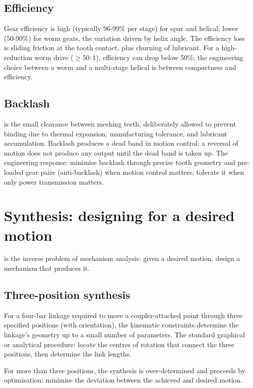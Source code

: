 \subsection{Efficiency}

Gear efficiency is high (typically 96-99\% per stage) for spur and helical; lower (50-90\%) for worm gears, the variation driven by helix angle. The efficiency loss is sliding friction at the tooth contact, plus churning of lubricant. For a high-reduction worm drive ($\geq 50:1$), efficiency can drop below 50\%; the engineering choice between a worm and a multi-stage helical is between compactness and efficiency.

\subsection{Backlash}

 is the small clearance between meshing teeth, deliberately allowed to prevent binding due to thermal expansion, manufacturing tolerance, and lubricant accumulation. Backlash produces a dead band in motion control: a reversal of motion does not produce any output until the dead band is taken up. The engineering response: minimise backlash through precise tooth geometry and pre-loaded gear pairs (anti-backlash) when motion control matters; tolerate it when only power transmission matters.

\section{Synthesis: designing for a desired motion}

 is the inverse problem of mechanism analysis: given a desired motion, design a mechanism that produces it.

\subsection{Three-position synthesis}

For a four-bar linkage required to move a coupler-attached point through three specified positions (with orientation), the kinematic constraints determine the linkage's geometry up to a small number of parameters. The standard graphical or analytical procedure: locate the centres of rotation that connect the three positions, then determine the link lengths.

For more than three positions, the synthesis is over-determined and proceeds by optimisation: minimise the deviation between the achieved and desired motion.

